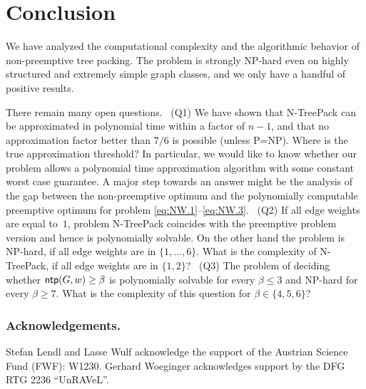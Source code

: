 \documentclass[runningheads]{llncs}
\newcommand{\set}[1]{\{ #1 \}}
\newcommand{\fromto}[2]{\set{#1, \ldots, #2}}
\newcommand{\xxxNTP}{{\sc N-TreePack}}
\DeclareMathOperator{\ntp}{\text{\sf ntp}}
\begin{document}


\section{Conclusion}
\label{sec:conclusion}
We have analyzed the computational complexity and the algorithmic behavior of non-preemptive
tree packing.
The problem is strongly NP-hard even on highly structured and extremely simple graph classes,
and we only have a handful of positive results.

There remain many open questions.
~(Q1) We have shown that {\xxxNTP} can be approximated in polynomial time within a factor of $n-1$, 
and that no approximation factor better than $7/6$ is possible (unless P=NP).
Where is the true approximation threshold?
In particular, we would like to know whether our problem allows a polynomial time approximation
algorithm with some constant worst case guarantee.
A major step towards an answer might be the analysis of the gap between the non-preemptive optimum 
and the polynomially computable preemptive optimum for problem \eqref{eq:NW.1}--\eqref{eq:NW.3}.
~(Q2) If all edge weights are equal to~$1$, problem {\xxxNTP} coincides with the preemptive problem 
version and hence is polynomially solvable.
On the other hand the problem is NP-hard, if all edge weights are in $\fromto{1}{6}$. 
What is the complexity of {\xxxNTP}, if all edge weights are in $\{1,2\}$?
~(Q3) The problem of deciding whether $\ntp(G,w)\ge\beta$ is polynomially solvable for 
every $\beta\le3$ and NP-hard for every $\beta\ge7$.
What is the complexity of this question for $\beta\in\{4,5,6\}$?


\subsubsection*{Acknowledgements.}
Stefan Lendl and Lasse Wulf acknowledge the support of the Austrian Science Fund (FWF): W1230.
Gerhard Woeginger acknowledges support by the DFG RTG 2236 ``UnRAVeL''.

%
%





\end{document}
